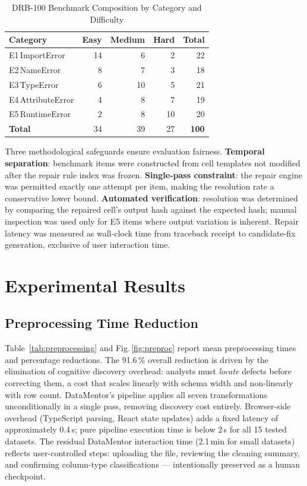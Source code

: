 \documentclass[conference]{IEEEtran}
\begin{document}
\begin{table}[t]
\centering
\caption{DRB-100 Benchmark Composition by Category and Difficulty}
\label{tab:drb100}
\renewcommand{\arraystretch}{1.1}
\setlength{\tabcolsep}{5pt}
\begin{tabular}{lrrrr}
\toprule
\textbf{Category} & \textbf{Easy} & \textbf{Medium}
                  & \textbf{Hard}  & \textbf{Total} \\
\midrule
E1\,ImportError    & 14 &  6 &  2 & 22 \\
E2\,NameError      &  8 &  7 &  3 & 18 \\
E3\,TypeError      &  6 & 10 &  5 & 21 \\
E4\,AttributeError &  4 &  8 &  7 & 19 \\
E5\,RuntimeError   &  2 &  8 & 10 & 20 \\
\midrule
\textbf{Total}     & 34 & 39 & 27 & \textbf{100} \\
\bottomrule
\end{tabular}
\end{table}

Three methodological safeguards ensure evaluation fairness.
\textbf{Temporal separation}: benchmark items were constructed from
cell templates not modified after the repair rule index was frozen.
\textbf{Single-pass constraint}: the repair engine was permitted exactly
one attempt per item, making the resolution rate a conservative lower
bound. \textbf{Automated verification}: resolution was determined by
comparing the repaired cell's output hash against the expected hash;
manual inspection was used only for E5 items where output variation is
inherent. Repair latency was measured as wall-clock time from traceback
receipt to candidate-fix generation, exclusive of user interaction time.

\section{Experimental Results}
\label{sec:results}

\subsection{Preprocessing Time Reduction}

Table~\ref{tab:preprocessing} and Fig.\,\ref{fig:preproc} report mean
preprocessing times and percentage reductions. The 91.6\,\% overall
reduction is driven by the elimination of cognitive discovery overhead:
analysts must \emph{locate} defects before correcting them, a cost that
scales linearly with schema width and non-linearly with row count.
DataMentor's pipeline applies all seven transformations unconditionally
in a single pass, removing discovery cost entirely. Browser-side
overhead (TypeScript parsing, React state updates) adds a fixed latency
of approximately 0.4\,s; pure pipeline execution time is below 2\,s for
all 15 tested datasets. The residual DataMentor interaction time
(2.1\,min for small datasets) reflects user-controlled steps: uploading
the file, reviewing the cleaning summary, and confirming column-type
classifications — intentionally preserved as a human checkpoint.
\end{document}
